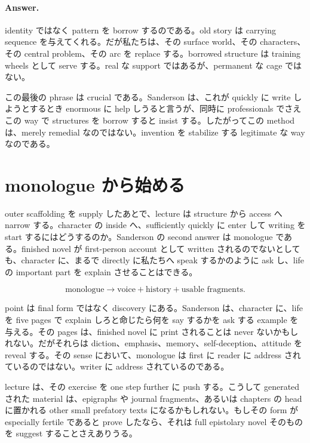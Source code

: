 \paragraph{Answer.} identity ではなく pattern を borrow するのである。old story は carrying sequence を与えてくれる。だが私たちは、その surface world、その characters、その central problem、その arc を replace する。borrowed structure は training wheels として serve する。real な support ではあるが、permanent な cage ではない。

この最後の phrase は crucial である。Sanderson は、これが quickly に write しようとするとき enormous に help しうると言うが、同時に professionals でさえこの way で structures を borrow すると insist する。したがってこの method は、merely remedial なのではない。invention を stabilize する legitimate な way なのである。

\section{monologue から始める}

outer scaffolding を supply したあとで、lecture は structure から access へ narrow する。character の inside へ、sufficiently quickly に enter して writing を start するにはどうするのか。Sanderson の second answer は monologue である。finished novel が first-person account として written されるのでないとしても、character に、まるで directly に私たちへ speak するかのように ask し、life の important part を explain させることはできる。

\begin{equation}
\text{monologue} \to \text{voice} + \text{history} + \text{usable fragments}.
\end{equation}

point は final form ではなく discovery にある。Sanderson は、character に、life を five pages で explain しろと命じたら何を say するかを ask する example を与える。その pages は、finished novel に print されることは never ないかもしれない。だがそれらは diction、emphasis、memory、self-deception、attitude を reveal する。その sense において、monologue は first に reader に address されているのではない。writer に address されているのである。

lecture は、その exercise を one step further に push する。こうして generated された material は、epigraphs や journal fragments、あるいは chapters の head に置かれる other small prefatory texts になるかもしれない。もしその form が especially fertile であると prove したなら、それは full epistolary novel そのものを suggest することさえありうる。


